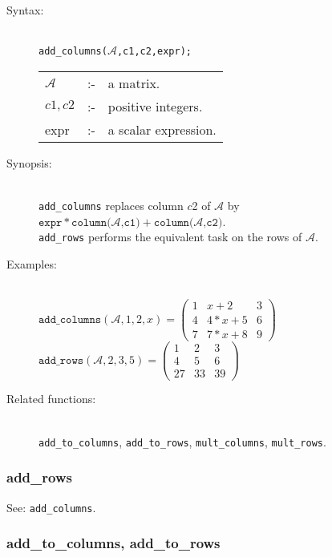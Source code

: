 \begin{description}
\item[Syntax:]\mbox{}\\
\texttt{add\_columns($\mathcal{A}$,c1,c2,expr);}

\begin{tabular}{l l l}
$\mathcal{A}$ & :- & a matrix. \\
$c1,c2$      & :- & positive integers. \\
expr       & :- & a scalar expression.
\end{tabular}

\item[Synopsis:]\mbox{}\\
\texttt{add\_columns} replaces column $c$2 of $\mathcal{A}$ by\\
$\texttt{expr} * \texttt{column($\mathcal{A}$,c1)} + \texttt{column($\mathcal{A}$,c2)}$.\\
\texttt{add\_rows} performs the equivalent task on the rows of $\mathcal{A}$.

\item[Examples:]\mbox{}\\
  \(\texttt{add\_columns}(\mathcal{A},1,2,x)  =
  \begin{pmatrix} 1 & x+2 & 3 \\ 4 & 4*x+5 & 6 \\ 7 & 7*x+8 & 9 \end{pmatrix}\) \\[2mm]
  \(\texttt{add\_rows}(\mathcal{A},2,3,5)  =
  \begin{pmatrix} 1 & 2 & 3 \\ 4 & 5 & 6 \\ 27 & 33 & 39 \end{pmatrix}\)

\item[Related functions:]\mbox{}\\
\texttt{add\_to\_columns}, \texttt{add\_to\_rows},
\texttt{mult\_columns}, \texttt{mult\_rows}.
\end{description}

\subsubsection{add\_rows}
\label{linalg:add_rows}

See: \texttt{add\_columns}.


\subsubsection{add\_to\_columns, add\_to\_rows}
\label{linalg:add_to_columns}

